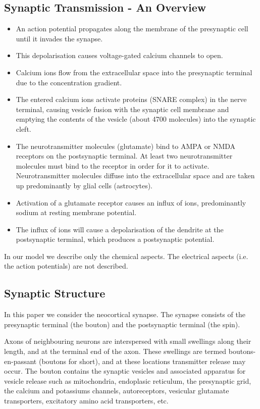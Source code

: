 \documentclass[a4paper]{article}
\begin{document}
\subsection{Synaptic Transmission - An Overview}
\begin{itemize}
    \item An action potential propagates along the membrane of the presynaptic cell until it invades the synapse.
    \item This depolarisation causes voltage-gated calcium channels to open.
    \item Calcium ions flow from the extracellular space into the presynaptic terminal due to the concentration gradient.
    \item The entered calcium ions activate proteins (SNARE complex) in the nerve terminal, causing vesicle fusion with the synaptic cell membrane and emptying the contents of the vesicle (about 4700 molecules) into the synaptic cleft.
    \item The neurotransmitter molecules (glutamate) bind to AMPA or NMDA receptors on the postsynaptic terminal. At least two neurotransmitter molecules must bind to the receptor in order for it to activate. Neurotransmitter molecules diffuse into the extracellular space and are taken up predominantly by glial cells (astrocytes). 
    \item Activation of a glutamate receptor causes an influx of ions, predominantly sodium at resting membrane potential. 
    \item The influx of ions will cause a depolarisation of the dendrite at the postsynaptic terminal, which produces a postsynaptic potential.
\end{itemize}

In our model we describe only the chemical aspects. The electrical aspects (i.e. the action potentials) are not described.

\subsection{Synaptic Structure}
In this paper we consider the neocortical synapse. The synapse consists of the presynaptic terminal (the bouton) and the postsynaptic terminal (the spin). 

Axons of neighbouring neurons are interspersed with small swellings along their length, and at the terminal end of the axon. These swellings are termed boutons-en-passant (boutons for short), and at these locations transmitter release may occur. The bouton contains the synaptic vesicles and associated apparatus for vesicle release such as mitochondria, endoplasic reticulum, the presynaptic grid, the calcium and potassiums channels, autoreceptors, vesicular glutamate transporters, excitatory amino acid transporters, etc.
\end{document}
